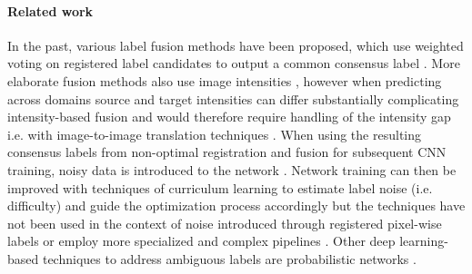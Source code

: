 
\paragraph{\textbf{Related work}}
\label{sec:related}
In the past, various label fusion methods have been proposed,
which use weighted voting on registered label candidates to output a common consensus label
\cite{artaechevarria2009combination,heckemann2006automatic,rohlfing2004performance,warfield2004simultaneous}.
More elaborate fusion methods also use image intensities \cite{wang2013multi}, however when predicting across domains source and target intensities can differ substantially complicating intensity-based fusion and would therefore require handling of the intensity gap i.e. with image-to-image translation techniques \cite{zhu2017unpaired}.
When using the resulting consensus labels from non-optimal registration and fusion for subsequent CNN training, noisy data is introduced to the network \cite{karimi2020deep}.
Network training can then be improved with techniques of curriculum learning to estimate label noise (i.e. difficulty) and guide the optimization process accordingly \cite{saxena2019data,castells2020superloss} but the techniques have not been used in the context of noise introduced through registered pixel-wise labels \cite{bengio2009curriculum,saxena2019data,castells2020superloss,jiang2018mentornet,zhang2020distilling} or employ more specialized and complex pipelines \cite{ding2019votenet,ding2020votenet+,liu2021style}.
Other deep learning-based techniques to address ambiguous labels are probabilistic networks \cite{kohl2018probabilistic}.

